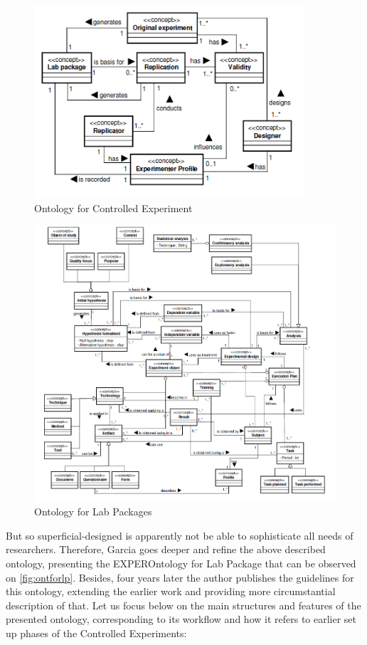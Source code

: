 	\begin{figure}
		\centering
		\includegraphics[width=10cm]{images/OntforCE.PNG}
		\caption{Ontology for Controlled Experiment\cite[p. 3]{Gar08}}
		\label{fig:ontforce}
	\end{figure}
	\begin{figure}
		\centering
		\includegraphics[width=18cm]{images/OntforLP.PNG}
		\caption{Ontology for Lab Packages\cite[p. 4]{Gar08}}
		\label{fig:ontforlp}
	\end{figure}
	But so superficial-designed is apparently not be able to sophisticate all needs of researchers. Therefore, Garcia goes deeper and refine the above described ontology,  presenting the EXPEROntology for Lab Package that can be observed on \autoref{fig:ontforlp}. Besides, four years later the author publishes the guidelines for this ontology\cite{Gar11}, extending the earlier work and providing more circumstantial description of that. Let us focus below on the main structures and features of the presented ontology, corresponding to its workflow and how it refers to earlier set up phases of the Controlled Experiments:
